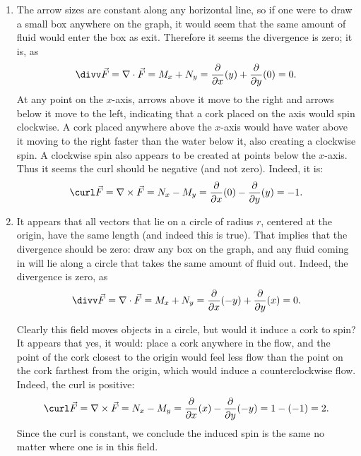 {\begin{enumerate}
	\item The arrow sizes are constant along any horizontal line, so if one were to draw a small box anywhere on the graph, it would seem that the same amount of fluid would enter the box as exit. Therefore it seems the divergence is zero; it is, as 
	$$\divv\vec F = \nabla \cdot \vec F = M_x + N_y = \frac{\partial}{\partial x}(y) + \frac{\partial}{\partial y}(0) = 0.$$
	At any point on the $x$-axis, arrows above it move to the right and arrows below it move to the left, indicating that a cork placed on the axis would spin clockwise. A cork placed anywhere above the $x$-axis would have water above it moving to the right faster than the water below it, also creating a clockwise spin. A clockwise spin also appears to be created at points below the $x$-axis. Thus it seems the curl should be negative (and not zero). Indeed, it is:
	$$\curl \vec F = \nabla\times\vec F = N_x-M_y = \frac{\partial}{\partial x}(0) - \frac{\partial}{\partial y}(y) = -1.$$
	
	\item It appears that all vectors that lie on a circle of radius $r$, centered at the  origin, have the same length (and indeed this is true). That implies that the divergence should be zero: draw any box on the graph, and any fluid coming in will lie along a circle that takes the same amount of fluid out. Indeed, the divergence is zero, as
	$$\divv\vec F = \nabla \cdot \vec F = M_x + N_y = \frac{\partial}{\partial x}(-y) + \frac{\partial}{\partial y}(x) = 0.$$
	
		Clearly this field moves objects in a circle, but would it induce a cork to spin? It appears that yes, it would: place a cork anywhere in the flow, and the point of the cork closest to the origin would feel less flow than the point on the cork farthest from the origin, which would induce a counterclockwise flow. Indeed, the curl is positive:
	$$\curl \vec F = \nabla\times\vec F = N_x-M_y = \frac{\partial}{\partial x}(x) - \frac{\partial}{\partial y}(-y) = 1-(-1) = 2.$$
	Since the curl is constant, we conclude the induced spin is the same no matter where one is in this field.
	

\end{enumerate}}
